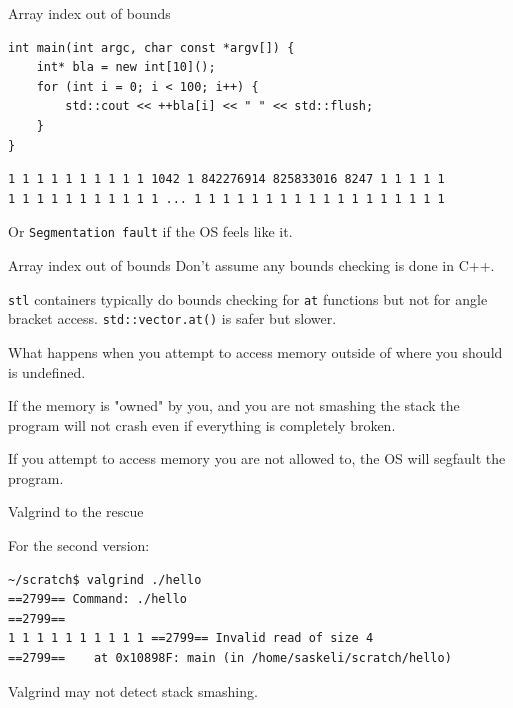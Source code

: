\documentclass[11pt, aspectratio=169, table]{beamer}
\begin{document}
\begin{frame}[fragile]{Array index out of bounds}
\begin{verbatim}
int main(int argc, char const *argv[]) {
    int* bla = new int[10]();
    for (int i = 0; i < 100; i++) {
        std::cout << ++bla[i] << " " << std::flush;
    }
}
\end{verbatim}

\pause\begin{verbatim}
1 1 1 1 1 1 1 1 1 1 1042 1 842276914 825833016 8247 1 1 1 1 1 
1 1 1 1 1 1 1 1 1 1 1 ... 1 1 1 1 1 1 1 1 1 1 1 1 1 1 1 1 1 1 
\end{verbatim}

Or \texttt{Segmentation fault} if the OS feels like it.
\end{frame}

\begin{frame}{Array index out of bounds}
\setlength\parskip{\fill}
Don't assume any bounds checking is done in C++. 

\texttt{stl} containers typically do bounds checking for \texttt{at} 
functions but not for angle bracket access. \texttt{std::vector.at()} is safer but slower.

What happens when you attempt to access memory outside of where you should is undefined.

If the memory is "owned" by you, and you are not smashing the stack the program will not crash even
if everything is completely broken.

If you attempt to access memory you are not allowed to, the OS will segfault the program.
\end{frame}

\begin{frame}[fragile]{Valgrind to the rescue}

For the second version:

\begin{verbatim}
~/scratch$ valgrind ./hello
==2799== Command: ./hello
==2799==
1 1 1 1 1 1 1 1 1 1 ==2799== Invalid read of size 4
==2799==    at 0x10898F: main (in /home/saskeli/scratch/hello)
\end{verbatim}

Valgrind may not detect stack smashing.
\end{frame}
\end{document}
